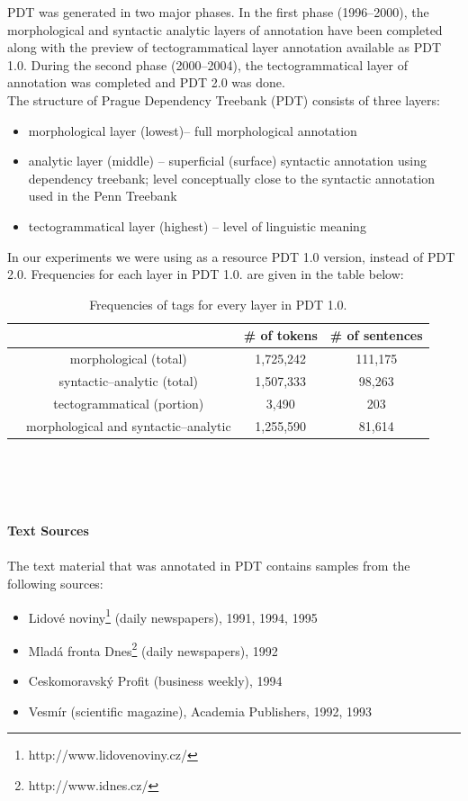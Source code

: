 PDT was generated in two major phases. In the first phase (1996--2000), the morphological and syntactic analytic  layers of annotation have been completed along with the preview of tectogrammatical layer annotation available as  PDT 1.0. During the second phase (2000--2004), the tectogrammatical layer of annotation was completed and PDT 2.0 was done.
\\The structure of Prague Dependency Treebank (PDT) consists of three layers:
\begin{itemize}
\item morphological layer (lowest)-- full morphological annotation
\item analytic  layer (middle) -- superficial (surface) syntactic annotation using dependency treebank; level conceptually close to the syntactic annotation used in the Penn Treebank 
\item tectogrammatical layer (highest) -- level of linguistic meaning
\end{itemize}
In our experiments we were using as a resource PDT 1.0 version, instead of PDT 2.0. Frequencies for each layer in PDT 1.0. are given in the table below:
\begin{table}[h!]
\begin{center}
	\begin{tabular}{ l  c  | c c }
   	&    & \# of tokens & \# of sentences \\
	\hline                       
	& morphological (total) & 1,725,242 & 111,175\\
	& syntactic--analytic (total) & 1,507,333 & 98,263 \\
  	& tectogrammatical (portion) & 3,490 &  203 \\
	& morphological and syntactic--analytic & 1,255,590 & 81,614 \\
	\end{tabular}
\end{center}
\caption{Frequencies of tags for every layer in PDT 1.0.}
\end{table}
\\\\\\\\
\textbf{Text Sources}
\\\\The text material that was annotated in PDT contains samples from the following sources:
\begin{itemize}
\item Lidov\'e noviny\footnote{http://www.lidovenoviny.cz/} (daily newspapers), 1991, 1994, 1995
\item Mlad\'a fronta Dnes\footnote{http://www.idnes.cz/} (daily newspapers), 1992
\item Ceskomoravsk\'y Profit (business weekly), 1994
\item Vesm\'ir (scientific magazine), Academia Publishers, 1992, 1993
\end{itemize}

